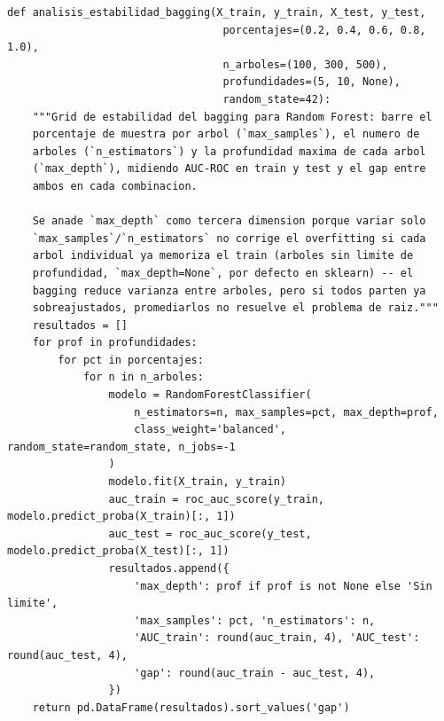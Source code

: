 \documentclass[11pt,a4paper]{article}
\begin{document}
\begin{lstlisting}[caption={Estabilidad del bagging, comparación temporal vs. aleatoria, y validación de ventana expansiva.}]
def analisis_estabilidad_bagging(X_train, y_train, X_test, y_test,
                                  porcentajes=(0.2, 0.4, 0.6, 0.8, 1.0),
                                  n_arboles=(100, 300, 500),
                                  profundidades=(5, 10, None),
                                  random_state=42):
    """Grid de estabilidad del bagging para Random Forest: barre el
    porcentaje de muestra por arbol (`max_samples`), el numero de
    arboles (`n_estimators`) y la profundidad maxima de cada arbol
    (`max_depth`), midiendo AUC-ROC en train y test y el gap entre
    ambos en cada combinacion.

    Se anade `max_depth` como tercera dimension porque variar solo
    `max_samples`/`n_estimators` no corrige el overfitting si cada
    arbol individual ya memoriza el train (arboles sin limite de
    profundidad, `max_depth=None`, por defecto en sklearn) -- el
    bagging reduce varianza entre arboles, pero si todos parten ya
    sobreajustados, promediarlos no resuelve el problema de raiz."""
    resultados = []
    for prof in profundidades:
        for pct in porcentajes:
            for n in n_arboles:
                modelo = RandomForestClassifier(
                    n_estimators=n, max_samples=pct, max_depth=prof,
                    class_weight='balanced', random_state=random_state, n_jobs=-1
                )
                modelo.fit(X_train, y_train)
                auc_train = roc_auc_score(y_train, modelo.predict_proba(X_train)[:, 1])
                auc_test = roc_auc_score(y_test, modelo.predict_proba(X_test)[:, 1])
                resultados.append({
                    'max_depth': prof if prof is not None else 'Sin limite',
                    'max_samples': pct, 'n_estimators': n,
                    'AUC_train': round(auc_train, 4), 'AUC_test': round(auc_test, 4),
                    'gap': round(auc_train - auc_test, 4),
                })
    return pd.DataFrame(resultados).sort_values('gap')



\end{lstlisting}
\end{document}
